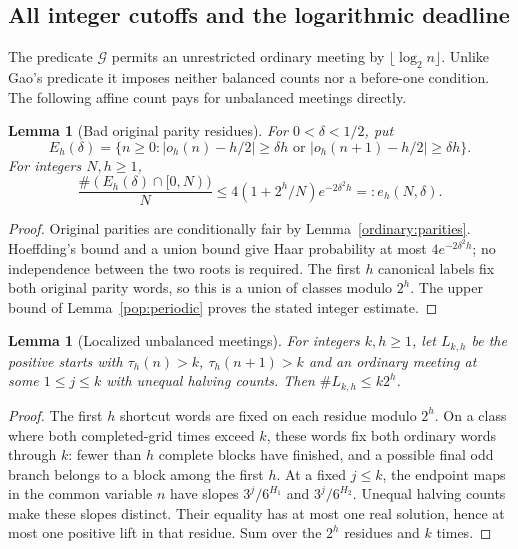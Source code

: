 \documentclass[11pt]{amsart}
\newtheorem{lemma}[theorem]{Lemma}
\theoremstyle{definition}
\theoremstyle{remark}
\begin{document}
\subsection{All integer cutoffs and the logarithmic deadline}

The predicate $\mathcal G$ permits an unrestricted ordinary meeting by
$\lfloor\log_2n\rfloor$. Unlike Gao's predicate it imposes neither
balanced counts nor a before-one condition. The following affine count
pays for unbalanced meetings directly.

\begin{lemma}[Bad original parity residues]\label{gaoexact:bad}
For $0<\delta<1/2$, put
\[
 E_h(\delta)=\{n\ge0:|o_h(n)-h/2|\ge\delta h
            \text{ or }|o_h(n+1)-h/2|\ge\delta h\}.
\]
For integers $N,h\ge1$,
\[
 \frac{\#(E_h(\delta)\cap[0,N))}N
 \le4(1+2^h/N)e^{-2\delta^2h}=:e_h(N,\delta).
\]
\end{lemma}
\begin{proof}
Original parities are conditionally fair by Lemma~\ref{ordinary:parities}.
Hoeffding's bound and a union bound give Haar probability at most
$4e^{-2\delta^2h}$; no independence between the two roots is required.
The first $h$ canonical labels fix both original parity words, so this
is a union of classes modulo $2^h$. The upper bound of
Lemma~\ref{pop:periodic} proves the stated integer estimate.
\end{proof}

\begin{lemma}[Localized unbalanced meetings]\label{gao:unbalanced-count}
For integers $k,h\ge1$, let $L_{k,h}$ be the positive starts with
$\tau_h(n)>k$, $\tau_h(n+1)>k$ and an ordinary meeting at some
$1\le j\le k$ with unequal halving counts. Then $\#L_{k,h}\le k2^h$.
\end{lemma}
\begin{proof}
The first $h$ shortcut words are fixed on each residue modulo $2^h$.
On a class where both completed-grid times exceed $k$, these words fix
both ordinary words through $k$: fewer than $h$ complete blocks have
finished, and a possible final odd branch belongs to a block among the
first $h$. At a fixed $j\le k$, the endpoint maps in the common variable
$n$ have slopes $3^j/6^{H_1}$ and $3^j/6^{H_2}$. Unequal halving counts
make these slopes distinct. Their equality has at most one real solution,
hence at most one positive lift in that residue. Sum over the $2^h$
residues and $k$ times.
\end{proof}
\end{document}
